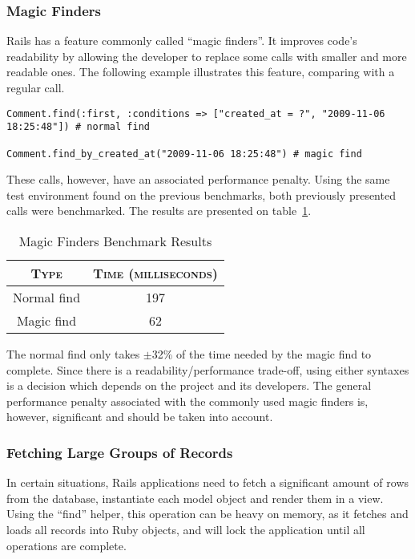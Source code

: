 \subsubsection{Magic Finders}
Rails has a feature commonly called ``magic finders''. It improves code's readability by allowing the developer to replace some calls with smaller and more readable ones. The following example illustrates this feature, comparing with a regular call.
\begin{lstlisting}[xleftmargin=30pt,xrightmargin=30pt]
Comment.find(:first, :conditions => ["created_at = ?", "2009-11-06 18:25:48"]) # normal find

Comment.find_by_created_at("2009-11-06 18:25:48") # magic find
\end{lstlisting}
These calls, however, have an associated performance penalty. Using the same test environment found on the previous benchmarks, both previously presented calls were benchmarked. The results are presented on table~\ref{tab:magic_finders}.
\begin{table}[h!t]
  \centering
  \caption{Magic Finders Benchmark Results}
  \label{tab:magic_finders}
  
  \begin{tabular}{c|c}
  
    \textbf{\textsc{Type}} & \textbf{\textsc{Time (milliseconds)}} \\ \hline
    Normal find & 197 \\ \hline
    Magic find & 62 \\
  \end{tabular}
\end{table}

The normal find only takes $\pm$32\% of the time needed by the magic find to complete. Since there is a readability/performance trade-off, using either syntaxes is a decision which depends on the project and its developers. The general performance penalty associated with the commonly used magic finders is, however, significant and should be taken into account.

\subsubsection{Fetching Large Groups of Records}
In certain situations, Rails applications need to fetch a significant amount of rows from the database, instantiate each model object and render them in a view. Using the ``find'' helper, this operation can be heavy on memory, as it fetches and loads all records into Ruby objects, and will lock the application until all operations are complete.

